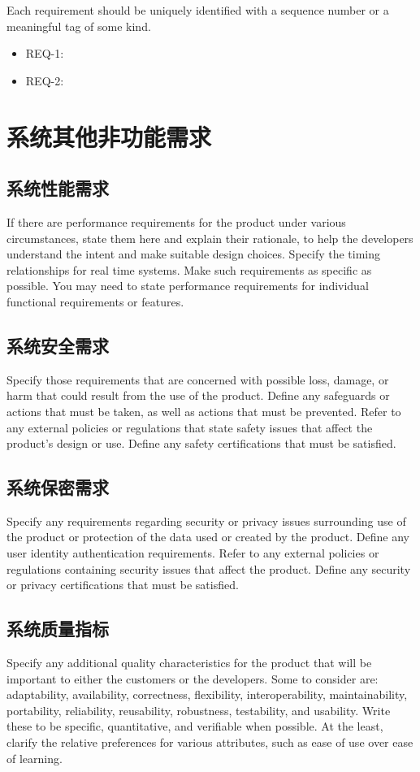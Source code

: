 \documentclass{ctexart}
\begin{document}
Each requirement should be uniquely identified with a sequence number or a 
meaningful tag of some kind.

\begin{itemize}
    \item REQ-1:
    \item REQ-2:
\end{itemize}



\section{系统其他非功能需求}\label{S:other-nonfunctional-requirements}
\subsection{系统性能需求}
If there are performance requirements for the product under various 
circumstances, state them here and explain their rationale, to help the 
developers understand the intent and make suitable design choices. Specify the 
timing relationships for real time systems. Make such requirements as specific 
as possible. You may need to state performance requirements for individual 
functional requirements or features.


\subsection{系统安全需求}
Specify those requirements that are concerned with possible loss, damage, or 
harm that could result from the use of the product. Define any safeguards or 
actions that must be taken, as well as actions that must be prevented. Refer to 
any external policies or regulations that state safety issues that affect the 
product's design or use. Define any safety certifications that must be 
satisfied.


\subsection{系统保密需求}
Specify any requirements regarding security or privacy issues surrounding use 
of the product or protection of the data used or created by the product. Define 
any user identity authentication requirements. Refer to any external policies or 
regulations containing security issues that affect the product. Define any 
security or privacy certifications that must be satisfied.


\subsection{系统质量指标}
Specify any additional quality characteristics for the product that will be 
important to either the customers or the developers. Some to consider are: 
adaptability, availability, correctness, flexibility, interoperability, 
maintainability, portability, reliability, reusability, robustness, testability, 
and usability. Write these to be specific, quantitative, and verifiable when 
possible. At the least, clarify the relative preferences for various attributes, 
such as ease of use over ease of learning.
\end{document}
